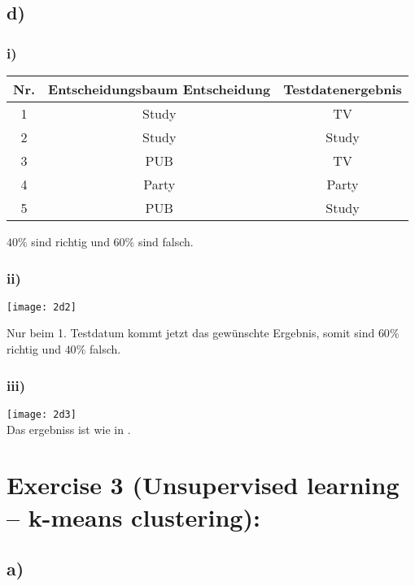 \documentclass[a4paper,parskip=full-]{article}
\begin{document}
\subsection{d)}
\subsubsection{i)}
\begin{tabular}{|c|c|c|}
\hline
Nr. & Entscheidungsbaum Entscheidung & Testdatenergebnis \\
\hline
\rowcolor{red} 1 & Study & TV \\
\hline
\rowcolor{green} 2 & Study & Study \\
\hline
\rowcolor{red} 3 & PUB & TV \\
\hline
\rowcolor{green} 4 & Party & Party \\
\hline
\rowcolor{red} 5 & PUB & Study \\
\hline
\end{tabular}

$40\%$ sind richtig und $60\%$ sind falsch.

\subsubsection{ii)}
\label{subsubsec:2d}

\texttt{[image: 2d2]}

Nur beim 1. Testdatum kommt jetzt das gewünschte Ergebnis, somit sind $60\%$ richtig und $40\%$ falsch.

\subsubsection{iii)}

\texttt{[image: 2d3]} \\
Das ergebniss ist wie in .

\section{Exercise 3 (Unsupervised learning – k-means clustering):}

\subsection{a)}
\label{subsec:kMeansClust}
\end{document}
